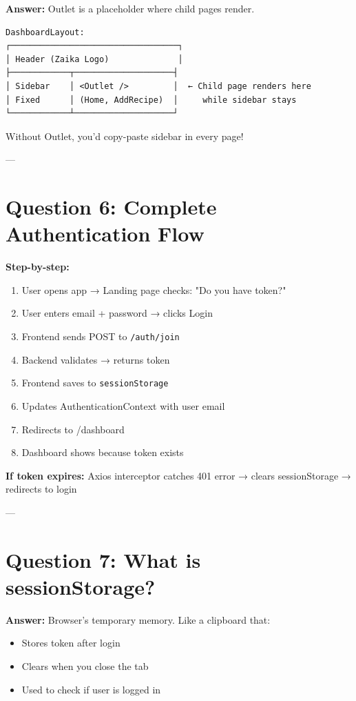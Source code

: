\documentclass[11pt]{article}
\begin{document}
\textbf{Answer:} Outlet is a placeholder where child pages render.

\begin{lstlisting}
DashboardLayout:
┌──────────────────────────────────┐
│ Header (Zaika Logo)              │
├────────────┬────────────────────┤
│ Sidebar    │ <Outlet />         │  ← Child page renders here
│ Fixed      │ (Home, AddRecipe)  │     while sidebar stays
└────────────┴────────────────────┘
\end{lstlisting}

Without Outlet, you'd copy-paste sidebar in every page!

---

\section*{Question 6: Complete Authentication Flow}

\textbf{Step-by-step:}

\begin{enumerate}
    \item User opens app → Landing page checks: "Do you have token?"
    \item User enters email + password → clicks Login
    \item Frontend sends POST to \texttt{/auth/join}
    \item Backend validates → returns token
    \item Frontend saves to \texttt{sessionStorage}
    \item Updates AuthenticationContext with user email
    \item Redirects to /dashboard
    \item Dashboard shows because token exists
\end{enumerate}

\textbf{If token expires:} Axios interceptor catches 401 error → clears sessionStorage → redirects to login

---

\section*{Question 7: What is sessionStorage?}

\textbf{Answer:} Browser's temporary memory. Like a clipboard that:
\begin{itemize}
    \item Stores token after login
    \item Clears when you close the tab
    \item Used to check if user is logged in
\end{itemize}
\end{document}
